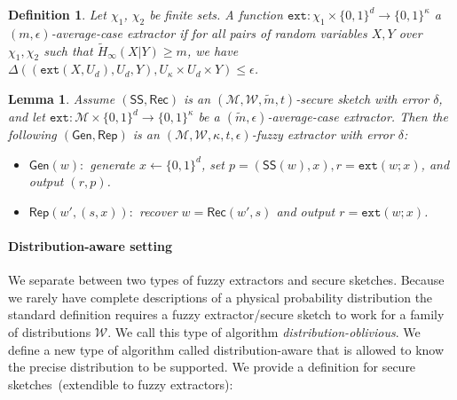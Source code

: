 \documentclass[11pt]{article}
\newcommand{\class}[1]{{\ensuremath{\mathsf{#1}}}}
\newcommand{\gen}{\ensuremath{\class{Gen}}\xspace}
\newcommand{\rep}{\ensuremath{\class{Rep}}\xspace}
\newcommand{\sketch}{\ensuremath{\class{SS}}\xspace}
\newcommand{\rec}{\ensuremath{\class{Rec}}\xspace}
\newcommand{\zo}{\ensuremath{\{0, 1\}}}
\newcommand{\ext}{\ensuremath{\mathtt{ext}}}
\newtheorem{lemma}[theorem]{Lemma}
\newtheorem{definition}[theorem]{Definition}
\begin{document}
\begin{definition}
Let $\chi_1$, $\chi_2$ be finite sets.
A function $\ext: \chi_1\times \{0,1\}^d \rightarrow \{0,1\}^\kappa$ a \emph{$(m, \epsilon)$-average-case extractor} if for all pairs
of random variables $X, Y$ over $\chi_1, \chi_2$ such that
$\tilde{H}_\infty(X|Y) \ge m$, we have $\Delta((\ext(X, U_d), U_d, Y), U_\kappa\times
U_d \times Y) \le \epsilon$.
\end{definition}

\begin{lemma}
\label{lem:fuzzy ext construction}
Assume $(\sketch, \rec)$ is an $(\mathcal{M}, \mathcal{W}, \tilde{m}, t)$-secure sketch with error $\delta$, and let $\ext:\mathcal{M}\times \zo^d \rightarrow \zo^\kappa$ be a $(\tilde{m}, \epsilon)$-average-case extractor.  Then the following $(\gen, \rep)$ is an $(\mathcal{M}, \mathcal{W}, \kappa, t, \epsilon)$-fuzzy extractor with error $\delta$:
\begin{itemize}
\item $\gen(w):$ generate $x\leftarrow \zo^d$, set $p=(\sketch(w), x), r=\ext(w;x)$, and output $(r,p)$.
\item $\rep(w', (s, x)):$ recover $w=\rec(w',s)$ and output $r=\ext(w;x)$.
\end{itemize}
\end{lemma}

\paragraph{Distribution-aware setting}
We separate between two types of fuzzy extractors and secure sketches.  Because we rarely have complete descriptions of a physical probability distribution the standard definition requires a fuzzy extractor/secure sketch to work for a family of distributions $\mathcal{W}$.  We call this type of algorithm \emph{distribution-oblivious}.  We define a new type of algorithm called distribution-aware that is allowed to know the precise distribution to be supported.  We provide a definition for secure sketches~(extendible to fuzzy extractors):
\end{document}
